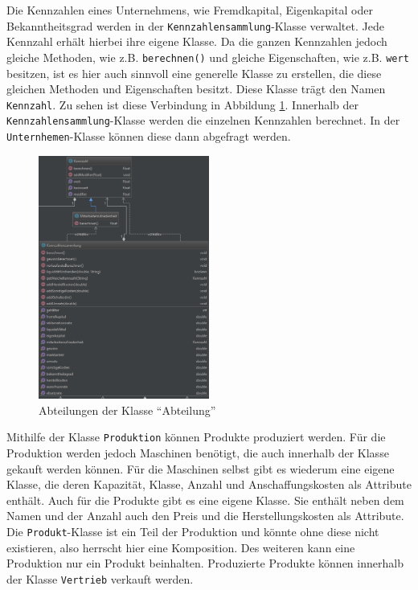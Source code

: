 Die Kennzahlen eines Unternehmens, wie Fremdkapital, Eigenkapital oder Bekanntheitsgrad werden in der
\texttt{Kennzahlensammlung}-Klasse verwaltet. Jede Kennzahl erhält hierbei ihre eigene Klasse. Da die ganzen Kennzahlen jedoch gleiche Methoden, wie z.B. \texttt{berechnen()} und gleiche Eigenschaften, wie z.B. \texttt{wert} besitzen, ist es hier auch sinnvoll eine generelle Klasse zu erstellen, die diese gleichen Methoden und Eigenschaften besitzt. Diese Klasse trägt den Namen \texttt{Kennzahl}. Zu sehen ist diese Verbindung in Abbildung \ref{abb:kennzahlen_verbindung}. Innerhalb der \texttt{Kennzahlensammlung}-Klasse werden die einzelnen Kennzahlen berechnet. In der \texttt{Unternhemen}-Klasse können diese dann abgefragt werden.
	\begin{figure}[h]
	\centering	\includegraphics[width=0.5\textwidth]{img/programmentwurf/kennzahlen_verbindung}
	\captionsetup{format=hang}
	\caption{
		\label{abb:kennzahlen_verbindung}Abteilungen der Klasse \enquote{Abteilung}}
\end{figure}	

Mithilfe der Klasse \texttt{Produktion} können Produkte produziert werden. Für die Produktion werden jedoch Maschinen benötigt, die auch innerhalb der Klasse gekauft werden können. Für die Maschinen selbst gibt es wiederum eine eigene Klasse, die deren Kapazität, Klasse, Anzahl und Anschaffungskosten als Attribute enthält.
Auch für die Produkte gibt es eine eigene Klasse. Sie enthält neben dem Namen und der Anzahl auch den Preis und die Herstellungskosten als Attribute. Die \texttt{Produkt}-Klasse ist ein Teil der Produktion und könnte ohne diese nicht existieren, also herrscht hier eine Komposition. Des weiteren kann eine Produktion nur ein Produkt beinhalten. 
Produzierte Produkte können innerhalb der Klasse \texttt{Vertrieb} verkauft werden.

